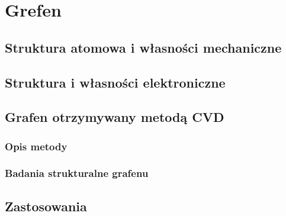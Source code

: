 \chapter{Grefen}
	\section{Struktura atomowa i własności mechaniczne}
	\section{Struktura i własności elektroniczne}
	\section{Grafen otrzymywany metodą CVD}
		\subsection{Opis metody}
		\subsection{Badania strukturalne grafenu}
	\section{Zastosowania}
